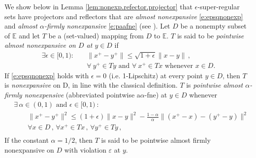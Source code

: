\documentclass[12pt]{article}
\theoremstyle{definition}
\begin{document}
We show below in Lemma \ref{lem:nonexp.refector.projector} that $\epsilon$-super-regular sets
 	 have projectors and reflectors that are {\em almost nonexpansive} \eqref{e:epsqnonexp} and
 	 {\em almost $\alpha$-firmly nonexpansive} \eqref{e:paafne}
 	 (see \cite[Definition 1]{berdellima2022alpha}).
Let $D$ be a nonempty subset of $\mathbb{E}$ and let $T$ be a (set-valued) mapping from $D$ to $\mathbb{E}$.
$T$ is said to be  {\em pointwise almost nonexpansive on $D$ at $ y \in D$} if %
\begin{align}\label{e:epsqnonexp}
\exists \epsilon\in [0,1):&\quad \|x^+- y^+\|\leq\sqrt{1+\epsilon}\|x- y\|\,,\\
&\quad \forall~ y^+\in T y \mbox{ and } \forall~ x^+\in Tx \mbox{ whenever }x\in D.
\end{align}
If \eqref{e:epsqnonexp} holds with $\epsilon= 0$ (i.e. 1-Lipschitz) at every point $y\in D$, then $T$ is  {\em nonexpansive} on D, in line with the classical definition.
$T$ is {\em pointwise almost $\alpha$-firmly nonexpensive}
(abbreviated pointwise a$\alpha$-fne) at $y\in D$ whenever
\begin{align}\label{e:paafne}
&\exists\,\alpha\in (0,1)\mbox{ and }\epsilon\in [0,1)~:\\
&\qquad \|x^+-y^+\|^2\leq (1+\epsilon)\|x-y\|^2-\frac{1-\alpha}{\alpha}\|(x^+-x)-(y^+-y)\|^2\\
    &\qquad \forall x\in D\,,\,\forall x^+\in Tx\,,\,\forall y^+\in Ty\,, \\
\end{align}
If the constant $\alpha=1/2$, then $T$ is said to be pointwise almost
firmly nonexpansive  on $D$ with violation 
$\varepsilon$ at $y$.
\end{document}
